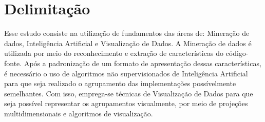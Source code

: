 \chapter{Delimitação}

	Esse estudo consiste na utilização de fundamentos das áreas de: Mineração de
	dados, Inteligência Artificial e Visualização de Dados. A Mineração de dados
	é utilizada por meio do reconhecimento e extração de características do código-fonte.
	Após a padronização de um formato de apresentação dessas características, é
	necessário o uso de algoritmos não supervisionados de Inteligência Artificial para
	que seja realizado o agrupamento das implementações possívelmente semelhantes.
	Com isso, emprega-se técnicas de Visualização de Dados para que seja possível
	representar os agrupamentos visualmente, por meio de projeções multidimensionais
	e algoritmos de visualização.